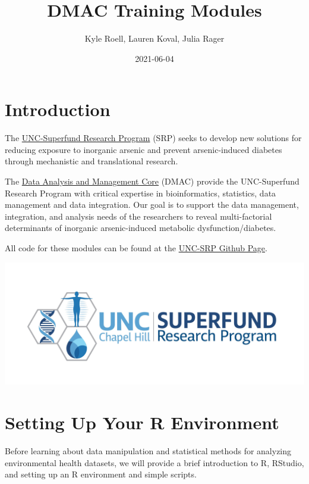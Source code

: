 \documentclass[
]{book}
\title{DMAC Training Modules}
\author{Kyle Roell, Lauren Koval, Julia Rager}
\date{2021-06-04}
\begin{document}
\maketitle

{
\setcounter{tocdepth}{1}
\tableofcontents
}
\hypertarget{introduction}{%
\chapter{Introduction}\label{introduction}}

The \href{https://sph.unc.edu/superfund-pages/srp/}{UNC-Superfund Research Program} (SRP) seeks to develop new solutions for reducing exposure to inorganic arsenic and prevent arsenic-induced diabetes through mechanistic and translational research.

The \href{https://sph.unc.edu/superfund-pages/dmac/}{Data Analysis and Management Core} (DMAC) provide the UNC-Superfund Research Program with critical expertise in bioinformatics, statistics, data management and data integration. Our goal is to support the data management, integration, and analysis needs of the researchers to reveal multi-factorial determinants of inorganic arsenic-induced metabolic dysfunction/diabetes.

All code for these modules can be found at the \href{https://github.com/UNCSRP}{UNC-SRP Github Page}.

\includegraphics[width=45.58in]{_book/test1_files/figure-html/SRP_logo}

\hypertarget{intro}{%
\chapter{Setting Up Your R Environment}\label{intro}}

Before learning about data manipulation and statistical methods for analyzing environmental health datasets, we will provide a brief introduction to R, RStudio, and setting up an R environment and simple scripts.
\end{document}
